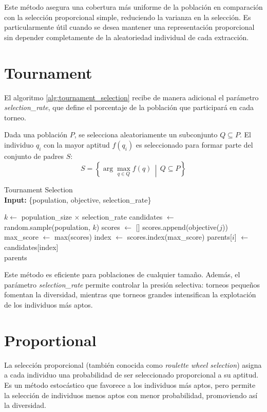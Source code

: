 Este método asegura una cobertura más uniforme de la población en comparación con la selección proporcional simple, reduciendo la varianza en la selección. Es particularmente útil cuando se desea mantener una representación proporcional sin depender completamente de la aleatoriedad individual de cada extracción.


\section{Tournament}

El algoritmo \ref{alg:tournament_selection} recibe de manera adicional el parámetro \textit{selection\_rate}, que define el porcentaje de la población que participará en cada torneo.

Dada una población $P$, se selecciona aleatoriamente un subconjunto $Q \subseteq P$. El individuo $q_i$ con la mayor aptitud $f(q_i)$ es seleccionado para formar parte del conjunto de padres $S$:
\[
S = \left\{ \arg\max_{q \in Q} f(q) \,\middle|\, Q \subseteq P \right\}
\]

\begin{algorithm}[H]
	\caption{Tournament Selection \\ \textbf{Input:} \{population, objective, selection\_rate\}}
	\begin{algorithmic}[1]
		\State $k \gets$ population\_size $\times$ selection\_rate
		\State candidates $\gets$ random.sample(population, $k$)
		\State scores $\gets$ []
		\State scores.append(objective($j$))
		\EndFor
		\State max\_score $\gets$ max(scores)
		\State index $\gets$ scores.index(max\_score)
		\State parents[$i$] $\gets$ candidates[index]
		\EndFor \\
		\Return parents
	\end{algorithmic}
	\label{alg:tournament_selection}
\end{algorithm}

Este método es eficiente para poblaciones de cualquier tamaño. Además, el parámetro \textit{selection\_rate} permite controlar la presión selectiva: torneos pequeños fomentan la diversidad, mientras que torneos grandes intensifican la explotación de los individuos más aptos.

\section{Proportional}

La selección proporcional (también conocida como \textit{roulette wheel selection}) asigna a cada individuo una probabilidad de ser seleccionado proporcional a su aptitud. Es un método estocástico que favorece a los individuos más aptos, pero permite la selección de individuos menos aptos con menor probabilidad, promoviendo así la diversidad.

